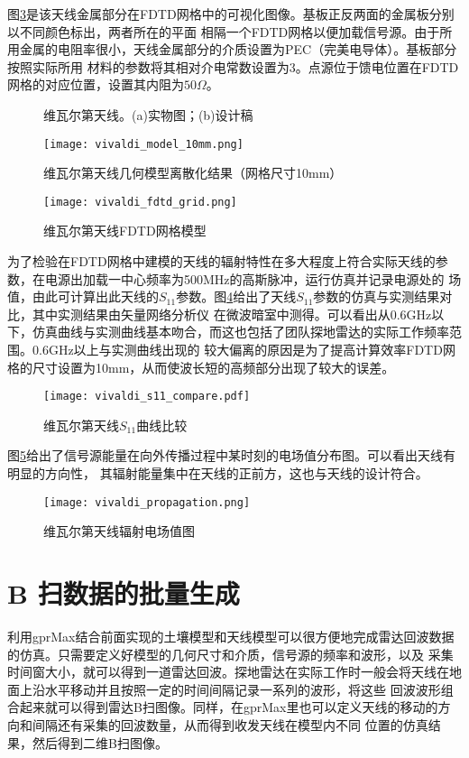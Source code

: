 图\ref{vivaldi_fdtd_grid}是该天线金属部分在FDTD网格中的可视化图像。基板正反两面的金属板分别以不同颜色标出，两者所在的平面
相隔一个FDTD网格以便加载信号源。由于所用金属的电阻率很小，天线金属部分的介质设置为PEC（完美电导体）。基板部分按照实际所用
材料的参数将其相对介电常数设置为3。点源位于馈电位置在FDTD网格的对应位置，设置其内阻为$50\Omega$。
\begin{figure}[htbp]
	\caption[]{维瓦尔第天线。(a)实物图；(b)设计稿}
	\label{vivaldi_design}
\end{figure}

\begin{figure}[htbp]
	\texttt{[image: vivaldi\_model\_10mm.png]}
	\caption[]{维瓦尔第天线几何模型离散化结果（网格尺寸10mm）}
	\label{vivaldi_model_10mm}
\end{figure}

\begin{figure}[htbp]
	\texttt{[image: vivaldi\_fdtd\_grid.png]}
	\caption[]{维瓦尔第天线FDTD网格模型}
	\label{vivaldi_fdtd_grid}
\end{figure}

为了检验在FDTD网格中建模的天线的辐射特性在多大程度上符合实际天线的参数，在电源出加载一中心频率为500MHz的高斯脉冲，运行仿真并记录电源处的
场值，由此可计算出此天线的$S_{11}$参数。图\ref{vivaldi_s11_compare}给出了天线$S_{11}$参数的仿真与实测结果对比，其中实测结果由矢量网络分析仪
在微波暗室中测得。可以看出从0.6GHz以下，仿真曲线与实测曲线基本吻合，而这也包括了团队探地雷达的实际工作频率范围。0.6GHz以上与实测曲线出现的
较大偏离的原因是为了提高计算效率FDTD网格的尺寸设置为10mm，从而使波长短的高频部分出现了较大的误差。
\begin{figure}[htbp]
	\texttt{[image: vivaldi\_s11\_compare.pdf]}
	\caption[]{维瓦尔第天线$S_{11}$曲线比较}
	\label{vivaldi_s11_compare}
\end{figure}

图\ref{vivaldi_propagation}给出了信号源能量在向外传播过程中某时刻的电场值分布图。可以看出天线有明显的方向性，
其辐射能量集中在天线的正前方，这也与天线的设计符合。
\begin{figure}[htbp]
	\texttt{[image: vivaldi\_propagation.png]}
	\caption[]{维瓦尔第天线辐射电场值图}
	\label{vivaldi_propagation}
\end{figure}
\section{B 扫数据的批量生成}
利用gprMax结合前面实现的土壤模型和天线模型可以很方便地完成雷达回波数据的仿真。只需要定义好模型的几何尺寸和介质，信号源的频率和波形，以及
采集时间窗大小，就可以得到一道雷达回波。探地雷达在实际工作时一般会将天线在地面上沿水平移动并且按照一定的时间间隔记录一系列的波形，将这些
回波波形组合起来就可以得到雷达B扫图像。同样，在gprMax里也可以定义天线的移动的方向和间隔还有采集的回波数量，从而得到收发天线在模型内不同
位置的仿真结果，然后得到二维B扫图像。

